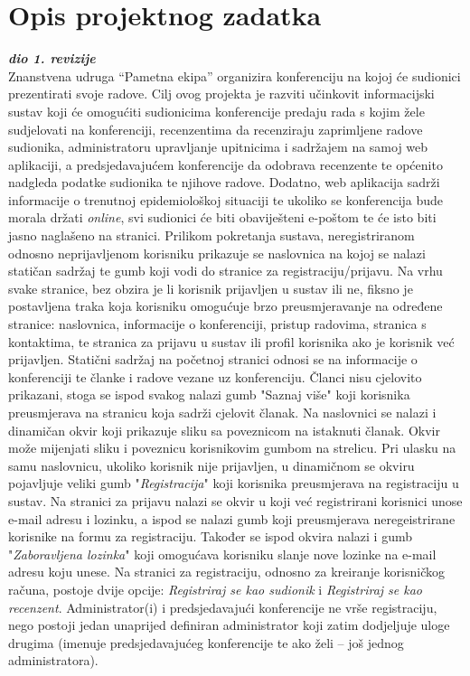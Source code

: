\chapter{Opis projektnog zadatka}
		
		\textbf{\textit{dio 1. revizije}}\\

		Znanstvena udruga “Pametna ekipa” organizira konferenciju na kojoj će sudionici prezentirati svoje radove. Cilj ovog projekta je razviti učinkovit informacijski sustav koji će omogućiti sudionicima konferencije predaju rada s kojim žele sudjelovati na konferenciji, recenzentima da recenziraju zaprimljene radove sudionika, administratoru upravljanje upitnicima i sadržajem na samoj web aplikaciji, a predsjedavajućem konferencije da odobrava recenzente te općenito nadgleda podatke sudionika te njihove radove. Dodatno, web aplikacija sadrži informacije o trenutnoj epidemiološkoj situaciji te ukoliko se konferencija bude morala držati \textit{online}, svi sudionici će biti obaviješteni e-poštom te će isto biti jasno naglašeno na stranici.
		\newline
		\newline
		Prilikom pokretanja sustava, neregistriranom odnosno neprijavljenom korisniku prikazuje se naslovnica na kojoj se nalazi statičan sadržaj te gumb koji vodi do stranice za registraciju/prijavu. Na vrhu svake stranice, bez obzira je li korisnik prijavljen u sustav ili ne, fiksno je postavljena traka koja korisniku omogućuje brzo preusmjeravanje na određene stranice: naslovnica, informacije o konferenciji, pristup radovima, stranica s kontaktima, te stranica za prijavu u sustav ili profil korisnika ako je korisnik već prijavljen. Statični sadržaj na početnoj stranici odnosi se na informacije o konferenciji te članke i radove vezane uz konferenciju. Članci nisu cjelovito prikazani, stoga se ispod svakog nalazi gumb "Saznaj više" koji korisnika preusmjerava na stranicu koja sadrži cjelovit članak. Na naslovnici se nalazi i dinamičan okvir koji prikazuje sliku sa poveznicom na istaknuti članak. Okvir može mijenjati sliku i poveznicu korisnikovim gumbom na strelicu. Pri ulasku na samu naslovnicu, ukoliko korisnik nije prijavljen, u dinamičnom se okviru pojavljuje veliki gumb "\textit{Registracija}" koji korisnika preusmjerava na registraciju u sustav. 
		\newline
		\newline
		Na stranici za prijavu nalazi se okvir u koji već registrirani korisnici unose e-mail adresu i lozinku, a ispod se nalazi gumb koji preusmjerava neregeistrirane korisnike na formu za registraciju. Također se ispod okvira nalazi i gumb "\textit{Zaboravljena lozinka}" koji omogućava korisniku slanje nove lozinke na e-mail adresu koju unese. Na stranici za registraciju, odnosno za kreiranje korisničkog računa, postoje dvije opcije: \textit{Registriraj se kao sudionik} i \textit{Registriraj se kao recenzent}. Administrator(i) i predsjedavajući konferencije ne vrše registraciju, nego postoji jedan unaprijed definiran administrator koji zatim dodjeljuje uloge drugima (imenuje predsjedavajućeg konferencije te ako želi – još jednog administratora).
